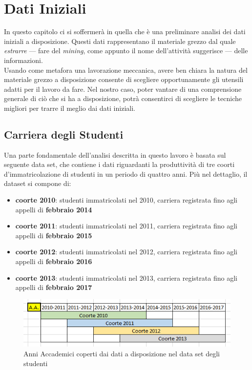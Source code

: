\chapter{Dati Iniziali}
\label{ch:rawd}

In questo capitolo ci si soffermerà in quella che è una preliminare analisi dei dati iniziali a disposizione. Questi dati rappresentano il materiale grezzo dal quale \textit{estrarre} --- fare del \textit{mining}, come appunto il nome dell'attività suggerisce --- delle informazioni. \\

Usando come metafora una lavorazione meccanica, avere ben chiara la natura del materiale grezzo a disposizione consente di scegliere opportunamente gli utensili adatti per il lavoro da fare. Nel nostro caso, poter vantare di una comprensione generale di ciò che si ha a disposizione, potrà consentirci di scegliere le tecniche migliori per trarre il meglio dai dati iniziali. \\

\section{Carriera degli Studenti}

Una parte fondamentale dell'analisi descritta in questo lavoro è basata sul seguente data set, che contiene i dati riguardanti la produttività di tre coorti d'immatricolazione di studenti in un periodo di quattro anni. Più nel dettaglio, il dataset si compone di:

\begin{itemize}
	\item \textbf{coorte 2010}: studenti immatricolati nel 2010, carriera registrata fino agli appelli di \textbf{febbraio 2014}
	\item \textbf{coorte 2011}: studenti immatricolati nel 2011, carriera registrata fino agli appelli di \textbf{febbraio 2015}
	\item \textbf{coorte 2012}: studenti immatricolati nel 2012, carriera registrata fino agli appelli di \textbf{febbraio 2016}
	\item \textbf{coorte 2013}: studenti immatricolati nel 2013, carriera registrata fino agli appelli di \textbf{febbraio 2017}
\end{itemize}

\begin{figure}
    \centering
    \caption{Anni Accademici coperti dai dati a disposizione nel data set degli studenti}
    \label{1}
	\includegraphics[scale=0.75]{../raw/stud_comp.png}
\end{figure}

